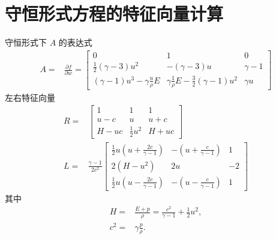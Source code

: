 \documentclass[10.5pt
]{article}
\begin{document}
\section{守恒形式方程的特征向量计算}\label{Appendix}
守恒形式下 $A$ 的表达式
\begin{align*}
A =& \frac{\partial f}{\partial w} = \left[\begin{array}{ccc} 0 & 1 & 0
\\
\frac{1}{2} (\gamma  - 3) u^2 & -(\gamma - 3) u & \gamma - 1
\\
(\gamma - 1) u^3 - \gamma \frac{u}{\rho} E & \gamma \frac{1}{\rho} E-\frac{3}{2} (\gamma
- 1) u^2 & \gamma u
\end{array}
\right]
\end{align*}
左右特征向量
\begin{align*}
R =& \left[\begin{array}{ccc} 1 & 1 & 1
\\
u - c & u & u + c
\\
H - u c & \frac{1}{2} u^2 & H + u c
\end{array}
\right]
\\
L =& \frac{\gamma - 1}{2 c^2} \left[\begin{array}{ccc} \frac{1}{2} u \left(u + \frac{2
c}{\gamma - 1}\right) & -\left(u + \frac{c}{\gamma - 1}\right) & 1
\\
2(H - u^2) & 2 u & - 2
\\
\frac{1}{2} u \left(u - \frac{2 c}{\gamma - 1}\right) & -\left(u - \frac{c}{\gamma -
1}\right) & 1
\end{array}
\right]
\end{align*}
其中
\begin{align*}
H =& \frac{E + p}{\rho} = \frac{c^2}{\gamma - 1} + \frac{1}{2} u^2,
\\
c^2 =& \gamma \frac{p}{\rho}.
\end{align*}
\end{document}
